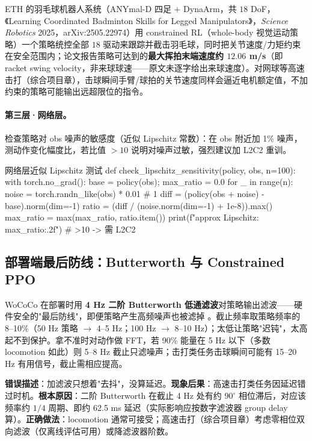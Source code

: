 ETH 的羽毛球机器人系统（ANYmal-D 四足 $+$ DynaArm，共 $18$ DoF，《Learning Coordinated Badminton Skills for Legged Manipulators》，\emph{Science Robotics} 2025，arXiv:2505.22974）用 constrained RL（whole-body 视觉运动策略）一个策略统控全部 $18$ 驱动来跟踪并截击羽毛球，同时把关节速度/力矩约束在安全范围内；论文报告策略可达到的\textbf{最大挥拍末端速度约 $12.06$ m/s}（即 racket swing velocity，非来球球速——原文未逐字给出来球速度）\cite{tennis_eth2025badminton}。对网球等高速击打（综合项目章），击球瞬间手臂/球拍的关节速度同样会逼近电机额定值，不加约束的策略可能输出远超限位的指令。

\paragraph{第三层·网络层。}检查策略对 obs 噪声的敏感度（近似 Lipschitz 常数）：在 obs 附近加 1\% 噪声，测动作变化幅度比，若比值 $>10$ 说明对噪声过敏，强烈建议加 L2C2 重训。

\begin{codebox}[Python]{网络层近似 Lipschitz 测试}
def check_lipschitz_sensitivity(policy, obs, n=100):
    with torch.no_grad():
        base = policy(obs); max_ratio = 0.0
        for _ in range(n):
            noise = torch.randn_like(obs) * 0.01           # 1%
            diff = (policy(obs + noise) - base).norm(dim=-1)
            ratio = (diff / (noise.norm(dim=-1) + 1e-8)).max()
            max_ratio = max(max_ratio, ratio.item())
    print(f"approx Lipschitz: {max_ratio:.2f}")            # >10 -> 需 L2C2
\end{codebox}

\subsection{部署端最后防线：Butterworth 与 Constrained PPO}

WoCoCo 在部署时用 \textbf{4 Hz 二阶 Butterworth 低通滤波}对策略输出滤波——硬件安全的"最后防线"，即便策略产生高频噪声也被滤掉 \cite{zhang2024wococo}。截止频率取策略频率的 8--10\%（50 Hz 策略 $\to$ 4--5 Hz；100 Hz $\to$ 8--10 Hz）；太低让策略"迟钝"，太高起不到保护。拿不准时对动作做 FFT，若 90\% 能量在 5 Hz 以下（多数 locomotion 如此）则 5--8 Hz 截止只滤噪声；击打类任务击球瞬间可能有 15--20 Hz 有用信号，截止需相应提高。

\begin{pitfall}
\textbf{错误描述}：加滤波只想着"去抖"，没算延迟。\textbf{现象后果}：高速击打类任务因延迟错过时机。\textbf{根本原因}：二阶 Butterworth 在截止 4 Hz 处有约 $90^\circ$ 相位滞后，对应该频率约 $1/4$ 周期、即约 62.5 ms 延迟（实际影响应按数字滤波器 group delay 算）。\textbf{正确做法}：locomotion 通常可接受；高速击打（综合项目章）考虑零相位双向滤波（仅离线评估可用）或降滤波器阶数。
\end{pitfall}

